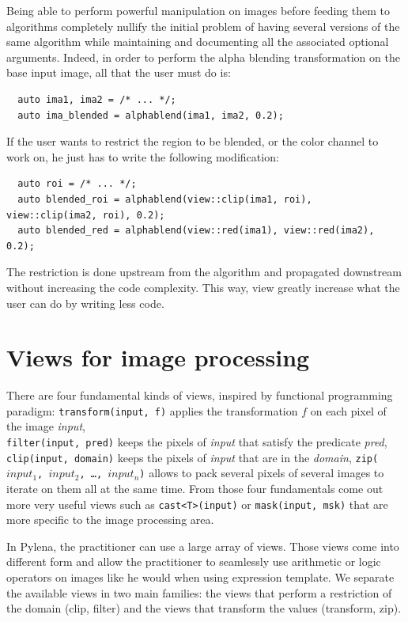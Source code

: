Being able to perform powerful manipulation on images before feeding them to algorithms completely nullify the initial
problem of having several versions of the same algorithm while maintaining and documenting all the associated optional
arguments. Indeed, in order to perform the alpha blending transformation on the base input image, all that the user must
do is:
\begin{verbatim}
  auto ima1, ima2 = /* ... */;
  auto ima_blended = alphablend(ima1, ima2, 0.2);
\end{verbatim}
If the user wants to restrict the region to be blended, or the color channel to work on, he just has to write the
following modification:
\begin{verbatim}
  auto roi = /* ... */;
  auto blended_roi = alphablend(view::clip(ima1, roi), view::clip(ima2, roi), 0.2);
  auto blended_red = alphablend(view::red(ima1), view::red(ima2), 0.2);
\end{verbatim}
The restriction is done upstream from the algorithm and propagated downstream without increasing the code complexity.
This way, view greatly increase what the user can do by writing less code.

\section{Views for image processing}
\label{sec:viws_for_ip}

There are four fundamental kinds of views, inspired by functional programming paradigm: \texttt{transform(input, f)}
applies the transformation \(f\) on each pixel of the image \emph{input},\\
\texttt{filter(input, pred)} keeps the pixels of \emph{input} that satisfy the predicate \emph{pred},
\texttt{clip(input, domain)} keeps the pixels of \emph{input} that are in the \emph{domain}, \texttt{zip(\(input_1\),
  \(input_2\), \ldots, \(input_n\))} allows to pack several pixels of several images to iterate on them all at the same
time. From those four fundamentals come out more very useful views such as \texttt{cast<T>(input)} or
\texttt{mask(input, msk)} that are more specific to the image processing area.

In Pylena, the practitioner can use a large array of views. Those views come into different form and allow the
practitioner to seamlessly use arithmetic or logic operators on images like he would when using expression template. We
separate the available views in two main families: the views that perform a restriction of the domain (clip, filter) and
the views that transform the values (transform, zip).

